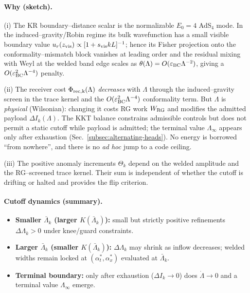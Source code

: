 \documentclass[10pt]{article}
\theoremstyle{definition}
\theoremstyle{plain}
\begin{document}
\paragraph{Why (sketch).}\label{par:uom-main-125}
(i) The KR boundary–distance scalar is the normalizable $E_0=4$ AdS$_4$ mode. In the induced–gravity/Robin regime its bulk wavefunction has a small visible boundary value $u_r(z_{\rm vis})\propto [1+s_{\rm vis}kL]^{-1}$; hence its Fisher projection onto the conformality–mismatch block vanishes at leading order and the residual mixing with Weyl at the welded band edge scales as $\theta(\Lambda)=O(\varepsilon_{\rm BC}\Lambda^{-2})$, giving a $O(\varepsilon_{\rm BC}^2\Lambda^{-4})$ penalty.

(ii) The receiver cost $\Phi_{\rm rec,k}(\Lambda)$ \emph{decreases} with $\Lambda$ through the induced–gravity screen in the trace kernel and the $O(\varepsilon_{\rm BC}^2\Lambda^{-4})$ conformality term. But $\Lambda$ is \emph{physical} (Wilsonian): changing it costs RG work $W_{\rm RG}$ and modifies the admitted payload $\Delta I_k(\Lambda)$. The KKT balance constrains admissible controls but does not permit a static cutoff while payload is admitted; the terminal value $\Lambda_\infty$ appears only after exhaustion (Sec.~\ref{subsec:alternating-heads}). No energy is borrowed ``from nowhere'', and there is no \emph{ad hoc} jump to a code ceiling.

(iii) The positive anomaly increments $\Theta_k$ depend on the welded amplitude and the RG–screened trace kernel. Their sum is independent of whether the cutoff is drifting or halted and provides the flip criterion.

\paragraph{Cutoff dynamics (summary).}\label{par:uom-main-126}
\begin{itemize}[leftmargin=1.4em]
\item \textbf{Smaller $\bar\Lambda_k$ (larger $K(\bar\Lambda_k)$):} small but strictly positive refinements $\Delta\Lambda_k>0$ under knee/guard constraints.
\item \textbf{Larger $\bar\Lambda_k$ (smaller $K(\bar\Lambda_k)$):} $\Delta\Lambda_k$ may shrink as inflow decreases; welded widths remain locked at $(\alpha_t^\ast,\alpha_x^\ast)$ evaluated at $\bar\Lambda_k$.
\item \textbf{Terminal boundary:} only after exhaustion ($\Delta I_k\to0$) does $\dot\Lambda\to0$ and a terminal value $\Lambda_\infty$ emerge.
\end{itemize}
\end{document}
